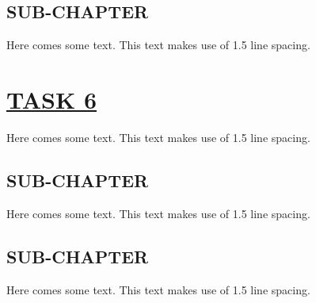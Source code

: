 \documentclass[fontsize=11pt]{scrartcl}
\begin{document}
\subsection{SUB-CHAPTER}
Here comes some text. This text makes use of 1.5 line spacing. 
\pagebreak
\section{\uline{TASK 6}}
Here comes some text. This text makes use of 1.5 line spacing. 
\subsection{SUB-CHAPTER}
Here comes some text. This text makes use of 1.5 line spacing. 
\subsection{SUB-CHAPTER}
Here comes some text. This text makes use of 1.5 line spacing. 
\end{document}
